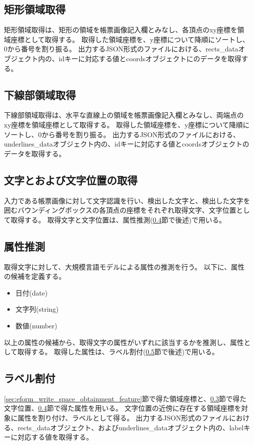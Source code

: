 \subsection{矩形領域取得}\label{subsec:rect_coords_obtainment}
矩形領域取得は、矩形の領域を帳票画像記入欄とみなし、各頂点のxy座標を領域座標として取得する。
取得した領域座標を、y座標について降順にソートし、0から番号を割り振る。
出力するJSON形式のファイルにおける、rects\_dataオブジェクト内の、idキーに対応する値とcoordsオブジェクトにのデータを取得する。


\subsection{下線部領域取得}\label{subsec:underline_coords_obtainment}
下線部領域取得は、水平な直線上の領域を帳票画像記入欄とみなし、両端点のxy座標を領域座標として取得する。
取得した領域座標を、y座標について降順にソートし、0から番号を割り振る。
出力するJSON形式のファイルにおける、underlines\_dataオブジェクト内の、idキーに対応する値とcoordsオブジェクトのデータを取得する。


\subsection{文字とおよび文字位置の取得}\label{subsec:char_and_bbox_obtainment}
入力である帳票画像に対して文字認識を行い、検出した文字と、検出した文字を囲むバウンディングボックスの各頂点の座標をそれぞれ取得文字、文字位置として取得する。
取得文字と文字位置は、属性推測(\ref{subsec:att_prediction}節で後述)で用いる。

\subsection{属性推測}\label{subsec:att_prediction}
取得文字に対して、大規模言語モデルによる属性の推測を行う。
以下に、属性の候補を定義する。

\begin{itemize}
    \item 日付(date)
    \item 文字列(string)
    \item 数値(number)
\end{itemize}

以上の属性の候補から、取得文字の属性がいずれに該当するかを推測し、属性として取得する。
取得した属性は、ラベル割付(\ref{subsec:label_link}節で後述)で用いる。

\subsection{ラベル割付}\label{subsec:label_link}
\ref{sec:eform_write_space_obtainment_feature}節で得た領域座標と、\ref{subsec:char_and_bbox_obtainment}節で得た文字位置、\ref{subsec:att_prediction}節で得た属性を用いる。
文字位置の近傍に存在する領域座標を対象に属性を割り付け、ラベルとして得る。
出力するJSON形式のファイルにおける、rects\_dataオブジェクト、およびunderlines\_dataオブジェクト内の、labelキーに対応する値を取得する。

